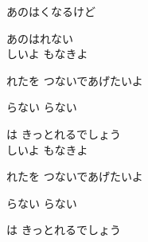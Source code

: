 {

あのはくなるけど

あのはれない
\\

しいよ もなきよ

れたを つないであげたいよ

らない らない

は きっとれるでしょう
\\

しいよ もなきよ

れたを つないであげたいよ

らない らない

は きっとれるでしょう

}